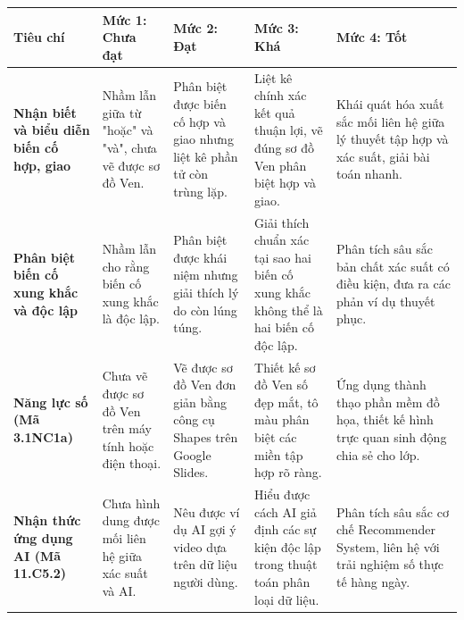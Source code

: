 \documentclass[12pt, a4paper]{article}
\begin{document}
\begin{center}
\begin{tabularx}{\textwidth}{|>{\bfseries}p{3cm}|X|X|X|X|}
\hline
\textbf{Tiêu chí} & \textbf{Mức 1: Chưa đạt} & \textbf{Mức 2: Đạt} & \textbf{Mức 3: Khá} & \textbf{Mức 4: Tốt} \\ \hline
Nhận biết và biểu diễn biến cố hợp, giao & Nhầm lẫn giữa từ "hoặc" và "và", chưa vẽ được sơ đồ Ven. & Phân biệt được biến cố hợp và giao nhưng liệt kê phần tử còn trùng lặp. & Liệt kê chính xác kết quả thuận lợi, vẽ đúng sơ đồ Ven phân biệt hợp và giao. & Khái quát hóa xuất sắc mối liên hệ giữa lý thuyết tập hợp và xác suất, giải bài toán nhanh. \\ \hline
Phân biệt biến cố xung khắc và độc lập & Nhầm lẫn cho rằng biến cố xung khắc là độc lập. & Phân biệt được khái niệm nhưng giải thích lý do còn lúng túng. & Giải thích chuẩn xác tại sao hai biến cố xung khắc không thể là hai biến cố độc lập. & Phân tích sâu sắc bản chất xác suất có điều kiện, đưa ra các phản ví dụ thuyết phục. \\ \hline
Năng lực số (Mã 3.1NC1a) & Chưa vẽ được sơ đồ Ven trên máy tính hoặc điện thoại. & Vẽ được sơ đồ Ven đơn giản bằng công cụ Shapes trên Google Slides. & Thiết kế sơ đồ Ven số đẹp mắt, tô màu phân biệt các miền tập hợp rõ ràng. & Ứng dụng thành thạo phần mềm đồ họa, thiết kế hình trực quan sinh động chia sẻ cho lớp. \\ \hline
Nhận thức ứng dụng AI (Mã 11.C5.2) & Chưa hình dung được mối liên hệ giữa xác suất và AI. & Nêu được ví dụ AI gợi ý video dựa trên dữ liệu người dùng. & Hiểu được cách AI giả định các sự kiện độc lập trong thuật toán phân loại dữ liệu. & Phân tích sâu sắc cơ chế Recommender System, liên hệ với trải nghiệm số thực tế hàng ngày. \\ \hline
\end{tabularx}
\end{center}
\end{document}

